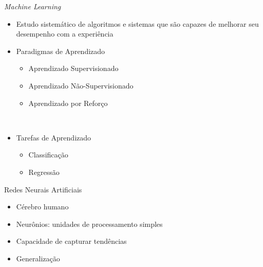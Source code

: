 %

\begin{frame}{\emph{Machine Learning}}
   \ \  \\[0.1cm]
  \begin{itemize}
  \item Estudo sistemático de algoritmos e sistemas que são capazes de melhorar seu desempenho com a experiência
  \ \ \newline
  \item Paradigmas de Aprendizado
  \begin{itemize}
    \item Aprendizado Supervisionado
    \item Aprendizado Não-Supervisionado
    \item Aprendizado por Reforço
  \end{itemize}
  \ \ \newline
  \item Tarefas de Aprendizado
  \begin{itemize}
    \item Classificação
    \item Regressão
  \end{itemize}
\end{itemize}
\end{frame}

\begin{frame}{Redes Neurais Artificiais}
   \ \  \\[0.1cm]
  \begin{itemize}
  \item Cérebro humano
  \ \ \newline
  \item Neurônios: unidades de processamento simples
    \ \ \newline
  \item Capacidade de capturar tendências
    \ \ \newline
  \item Generalização
\end{itemize}
\end{frame}


